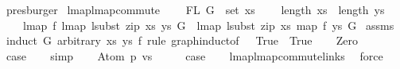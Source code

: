 \begin{isabellebody}
\ presburger%
\endisatagproof
{\isafoldproof}%
%
\isadelimproof
\isanewline
%
\endisadelimproof
\isanewline
\isanewline
\isanewline
{}\isamarkupfalse%
\ lmap{\isacharunderscore}{\kern0pt}lmap{\isacharunderscore}{\kern0pt}commute{\isacharcolon}{\kern0pt}\isanewline
\ \ \ \ {\isachardoublequoteopen}FL\ G\ {\isasymsubseteq}\ set\ xs{\isachardoublequoteclose}\isanewline
\ \ \ \ {\isachardoublequoteopen}length\ xs\ {\isacharequal}{\kern0pt}\ length\ ys{\isachardoublequoteclose}\isanewline
\ \ \ \ {\isachardoublequoteopen}lmap\ f\ {\isacharparenleft}{\kern0pt}lmap\ {\isacharparenleft}{\kern0pt}lsubst\ {\isacharparenleft}{\kern0pt}zip\ xs\ ys{\isacharparenright}{\kern0pt}{\isacharparenright}{\kern0pt}\ G{\isacharparenright}{\kern0pt}\ {\isacharequal}{\kern0pt}\ lmap\ {\isacharparenleft}{\kern0pt}lsubst\ {\isacharparenleft}{\kern0pt}zip\ xs\ {\isacharparenleft}{\kern0pt}map\ f\ ys{\isacharparenright}{\kern0pt}{\isacharparenright}{\kern0pt}{\isacharparenright}{\kern0pt}\ G{\isachardoublequoteclose}\isanewline
%
\isadelimproof
%
\endisadelimproof
%
\isatagproof
{}\isamarkupfalse%
\ assms\isanewline
{}\isamarkupfalse%
\ {\isacharparenleft}{\kern0pt}induct\ G\ arbitrary{\isacharcolon}{\kern0pt}\ xs\ ys\ f\ rule{\isacharcolon}{\kern0pt}\ graph{\isachardot}{\kern0pt}induct{\isacharbrackleft}{\kern0pt}of\ {\isacharunderscore}{\kern0pt}\ {\isachardoublequoteopen}{\isacharpercent}{\kern0pt}{\isacharunderscore}{\kern0pt}{\isachardot}{\kern0pt}\ True{\isachardoublequoteclose}\ {\isachardoublequoteopen}{\isacharpercent}{\kern0pt}{\isacharunderscore}{\kern0pt}{\isachardot}{\kern0pt}\ True{\isachardoublequoteclose}{\isacharbrackright}{\kern0pt}{\isacharparenright}{\kern0pt}\isanewline
\ \ \isamarkupfalse%
\ Zero\isanewline
\ \ \isamarkupfalse%
\ \isamarkupfalse%
\ {\isacharquery}{\kern0pt}case\isanewline
\ \ \isamarkupfalse%
\ simp\isanewline
{}\isamarkupfalse%
\isanewline
\ \ \isamarkupfalse%
\ {\isacharparenleft}{\kern0pt}Atom\ p\ vs{\isacharparenright}{\kern0pt}\isanewline
\ \ \isamarkupfalse%
\ \isamarkupfalse%
\ {\isacharquery}{\kern0pt}case\isanewline
\ \ \isamarkupfalse%
\ lmap{\isacharunderscore}{\kern0pt}lmap{\isacharunderscore}{\kern0pt}commute{\isacharunderscore}{\kern0pt}links\ \isamarkupfalse%
\ force\isanewline
{}\isamarkupfalse%

\end{isabellebody}
